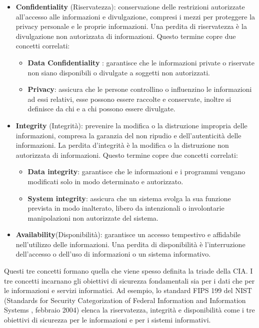 \begin{itemize}
    \item \textbf{Confidentiality} (Riservatezza):  conservazione delle restrizioni autorizzate all'accesso alle informazioni e divulgazione, compresi i mezzi per proteggere la privacy personale e le proprie informazioni. Una perdita di riservatezza è la divulgazione non autorizzata di informazioni. Questo termine copre due concetti correlati:
          \begin{itemize}
              \item  \textbf{Data Confidentiality} : garantisce che le informazioni private o riservate non siano disponibili o divulgate a soggetti non autorizzati.
              \item \textbf{Privacy}: assicura che le persone controllino o influenzino le informazioni
                    ad essi relativi, esse possono essere raccolte e conservate, inoltre si definisce da chi e a chi possono essere divulgate.
          \end{itemize}
    \item \textbf{Integrity} (Integrità): prevenire la modifica o la distruzione impropria delle informazioni, compresa la garanzia del non ripudio e dell'autenticità delle informazioni.
          La perdita d'integrità è la modifica o la distruzione non autorizzata di informazioni. Questo termine copre due concetti correlati:
          \begin{itemize}
              \item \textbf{Data integrity}:  garantisce che le informazioni e i programmi vengano modificati solo in modo determinato e autorizzato.
              \item \textbf{System integrity}: assicura che un sistema svolga la sua funzione prevista in modo inalterato, libero da intenzionali o involontarie manipolazioni non autorizzate del sistema.
          \end{itemize}
    \item \textbf{Availability}(Disponibilità): garantisce un accesso tempestivo e affidabile nell'utilizzo delle informazioni. Una perdita di disponibilità è l'interruzione dell'accesso o dell'uso di informazioni o un sistema informativo.
\end{itemize}

Questi tre concetti formano quella che viene spesso definita la triade della CIA. I tre
concetti incarnano gli obiettivi di sicurezza fondamentali sia per i dati che per le informazioni
e servizi informatici. Ad esempio, lo standard FIPS 199 del NIST (Standards for Security
Categorization of Federal Information and Information Systems , febbraio 2004) elenca la riservatezza, integrità e disponibilità come i tre obiettivi di sicurezza per le informazioni e
per i sistemi informativi.

